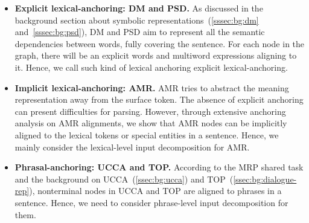 \begin{itemize}
\item \textbf{Explicit lexical-anchoring: DM and PSD.} As discussed in
  the background section about symbolic
  representations~(\autoref{sssec:bg:dm} and~\autoref{sssec:bg:psd}),
  DM and PSD aim to represent all the semantic dependencies between
  words, fully covering the sentence. For each node in the graph,
  there will be an explicit words and multiword expressions aligning
  to it. Hence, we call such kind of lexical anchoring explicit
  lexical-anchoring.

\item \textbf{Implicit lexical-anchoring: AMR.} AMR tries to abstract
  the meaning representation away from the surface token. The absence
  of explicit anchoring can present difficulties for parsing. However,
  through extensive anchoring analysis on AMR alignments, we show that
  AMR nodes can be implicitly aligned to the lexical tokens or special
  entities in a sentence. Hence, we mainly consider the lexical-level
  input decomposition for AMR.

\item \textbf{Phrasal-anchoring: UCCA and TOP.} According to the MRP
  shared task and the background on UCCA~(\autoref{ssec:bg:ucca}) and
  TOP~(\autoref{ssec:bg:dialogue-rep}), nonterminal nodes in UCCA and TOP are
  aligned to phrases in a sentence. Hence, we need to consider
  phrase-level input decomposition for them.
\end{itemize}

